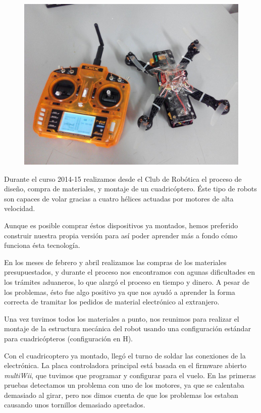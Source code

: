 \documentclass[12pt,twoside]{report}
\begin{document}
\begin{figure}\centering
    \includegraphics[scale=0.16]{fotos/dron1.jpg}
    \caption*{}
\end{figure}
Durante el curso 2014-15 realizamos desde el Club de Robótica el proceso de diseño, compra de materiales, y montaje de un cuadricóptero.
Éste tipo de robots son capaces de volar gracias a cuatro hélices actuadas por motores de alta velocidad.

Aunque es posible comprar éstos dispositivos ya montados, hemos preferido construir nuestra propia versión para así poder aprender más a fondo cómo funciona ésta tecnología.

En los meses de febrero y abril realizamos las compras de los materiales presupuestados, y durante el proceso nos encontramos con agunas dificultades en los trámites aduaneros, lo que alargó el proceso en tiempo y dinero. A pesar de los problemas, ésto fue algo positivo ya que nos ayudó a aprender la forma correcta de tramitar los pedidos de material electrónico al extranjero.

Una vez tuvimos todos los materiales a punto, nos reunimos para realizar el montaje de la estructura mecánica del robot usando una configuración estándar para cuadricópteros (configuración en H).

Con el cuadricoptero ya montado, llegó el turno de soldar las conexiones de la electrónica. La placa controladora principal está basada en el firmware abierto \emph{multiWii}, que tuvimos que programar y configurar para el vuelo.
En las primeras pruebas detectamos un problema con uno de los motores, ya que se calentaba demasiado al girar, pero nos dimos cuenta de que los problemas los estaban causando unos tornillos demasiado apretados.
\end{document}
